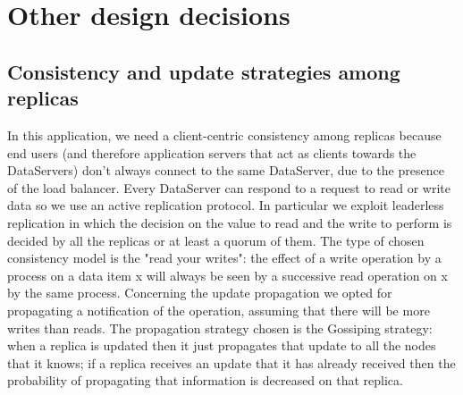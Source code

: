 \documentclass[a4paper]{report}
\begin{document}
\section{Other design decisions}
\subsection{Consistency and update strategies among replicas}
In this application,  we need a client-centric consistency among replicas because end users (and therefore application servers that act as clients towards the DataServers) don't always connect to the same DataServer, due to the presence of the load balancer. Every DataServer can respond to a request to read or write data so we use an active replication protocol. In particular we exploit leaderless replication in which the decision on the value to read and the write to perform is decided by all the replicas or at least a quorum of them. The type of chosen consistency model  is the "read your writes": the effect of a write operation by a process on a data item x will always be seen by a successive read operation on x by the same process. 
Concerning the update propagation we opted for propagating a notification of the operation, assuming that there will be more writes than reads.  The propagation strategy chosen is the Gossiping strategy: when a replica is updated then it just propagates that update to all the nodes that it knows; if a replica receives an update that it has already received then the probability of propagating that information is decreased on that replica. 
\end{document}
